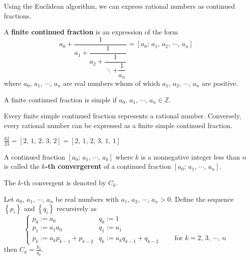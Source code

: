Using the Euclidean algorithm, we can express rational numbers
as continued fractions.

\begin{definition}
    A \textbf{finite continued fraction} is an expression of the form
    \[
        a_0 + \dfrac{1}{a_1 + \dfrac{1}{a_2 + \dfrac{1}{\ddots + \dfrac{1}{a_n}}}}
        = \left[a_0;\,a_1,\,a_2,\,\cdots,\,a_n\right]
    \]
    where $a_0,\,a_1,\,\cdots,\,a_n$ are real numbers whom of which
    $a_1,\,a_2,\,\cdots,\,a_n$ are positive.
    
    A finite continued fraction is simple if $a_0,\,a_1,\,\cdots,\,a_n \in \mathbb{Z}$.
\end{definition}

\begin{theorem}
    Every finite simple continued fraction represents a rational number.
    Conversely, every rational number can be expressed as a finite simple
    continued fraction.
\end{theorem}

\begin{remark}
    $\frac{62}{23} = \left[2,\,1,\,2,\,3,\,2\right] = \left[2,\,1,\,2,\,3,\,1,\,1\right]$
\end{remark}

\begin{definition}
    A continued fraction $\left[a_0;\,a_1,\,\cdots,\,a_k\right]$
    where $k$ is a nonnegative integer less than $n$ is called the
    \textbf{$k$-th convergerent} of a continued fraction $\left[a_0;\,a_1,\,\cdots,\,a_n\right]$.

    The $k$-th convergent is denoted by $C_k$.
\end{definition}

\begin{theorem}
    Let $a_0,\,a_1,\,\cdots,\,a_n$ be real numbers with $a_1,\, a_2,\,\cdots,\, a_n > 0$.
    Define the sequence $\left\{p_i\right\}$ and $\left\{q_i\right\}$ 
    recursively as
    \[
        \begin{cases}
            p_0 := a_0 & q_0 := 1 \\
            p_1 := a_1a_0 & q_1 := a_1 \\
            p_k := a_kp_{k-1} + p_{k-2} & q_k := a_k q_{k-1} + q_{k-2} \qquad \mbox{ for } k = 2,\,3,\,\cdots,\,n
        \end{cases}
    \]
    then $C_k = \frac{p_k}{q_k}$.
\end{theorem}